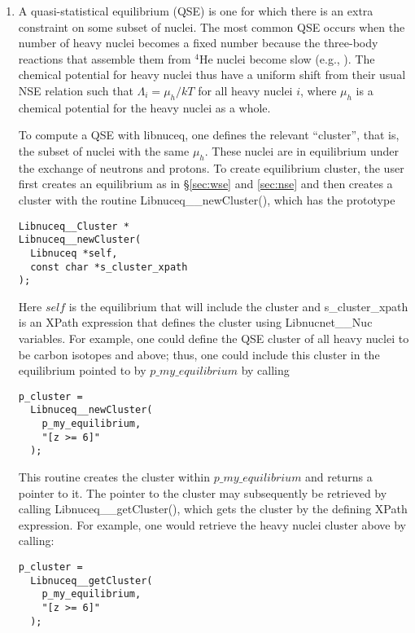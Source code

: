 \documentclass{article}    %
\begin{document}
\begin{enumerate}
\item\label{sec:qse}
A quasi-statistical equilibrium (QSE) is one for which there is an extra
constraint on some subset of nuclei.  The most common QSE occurs when
the number of heavy nuclei becomes a fixed number because the three-body
reactions that assemble them from $^4$He nuclei become slow
(e.g., \cite{1998ApJ...498..808M}).  The chemical potential for heavy
nuclei thus have a uniform shift from their usual NSE relation such that
$\Lambda_i = \mu_h / kT$ for all heavy nuclei $i$, where $\mu_h$ is
a chemical potential for the heavy nuclei as a whole.

To compute a QSE with libnuceq, one defines the relevant ``cluster'', that
is, the subset of nuclei with the same $\mu_h$.  These nuclei are in
equilibrium under the exchange of neutrons and protons.  To create
equilibrium cluster, the user first creates an equilibrium as in
\S \ref{sec:wse} and \ref{sec:nse}
and then creates a cluster with the routine
Libnuceq\_\_newCluster(), which has the prototype
\begin{verbatim}
Libnuceq__Cluster *
Libnuceq__newCluster(
  Libnuceq *self,
  const char *s_cluster_xpath
);
\end{verbatim}
Here $self$ is the equilibrium that will include the cluster and
s\_cluster\_xpath is an XPath expression that defines the cluster using
Libnucnet\_\_Nuc variables.  For example, one could define the QSE cluster
of all heavy nuclei to be carbon isotopes and above; thus, one could include
this cluster in the equilibrium pointed to by $p\_my\_equilibrium$ by
calling
\begin{verbatim}
p_cluster =
  Libnuceq__newCluster(
    p_my_equilibrium,
    "[z >= 6]"
  );
\end{verbatim}
This routine creates the cluster within $p\_my\_equilibrium$ and returns
a pointer to it.  The pointer to the cluster may subsequently be retrieved
by calling Libnuceq\_\_getCluster(), which gets the cluster by the
defining XPath expression.  For example, one would retrieve the heavy nuclei
cluster above by calling:
\begin{verbatim}
p_cluster =
  Libnuceq__getCluster(
    p_my_equilibrium,
    "[z >= 6]"
  );
\end{verbatim}


\end{enumerate}
\end{document}
